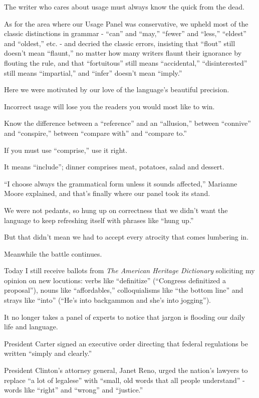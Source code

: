 \documentclass{book}
\numberwithin{equation}{section}
\begin{document}
The writer who cares about usage must always know the quick from the dead.

%
As for the area where our Usage Panel was conservative, we upheld most of the classic distinctions in grammar - ``can'' and ``may,'' ``fewer'' and ``less,'' ``eldest'' and ``oldest,'' etc. - and decried the classic errors, insisting that ``flout'' still doesn't mean ``flaunt,'' no matter how many writers flaunt their ignorance by flouting the rule, and that ``fortuitous'' still means ``accidental,'' ``disinterested'' still means ``impartial,'' and ``infer'' doesn't mean ``imply.''

Here we were motivated by our love of the language's beautiful precision.

Incorrect usage will lose you the readers you would most like to win.

Know the difference between a ``reference'' and an ``allusion,'' between ``connive'' and ``conspire,'' between ``compare with'' and ``compare to.''

If you must use ``comprise,'' use it right.

It means ``include''; dinner comprises meat, potatoes, salad and dessert.

%
``I choose always the grammatical form unless it sounds affected,'' Marianne Moore explained, and that's finally where our panel took its stand.

We were not pedants, so hung up on correctness that we didn't want the language to keep refreshing itself with phrases like ``hung up.''

But that didn't mean we had to accept every atrocity that comes lumbering in.

%
Meanwhile the battle continues.

Today I still receive ballots from \textit{The American Heritage Dictionary} soliciting my opinion on new locutions: verbs like ``definitize'' (``Congress definitized a proposal''), nouns like ``affordables,'' colloquialisms like ``the bottom line'' and strays like ``into'' (``He's into backgammon and she's into jogging'').

%
It no longer takes a panel of experts to notice that jargon is flooding our daily life and language.

President Carter signed an executive order directing that federal regulations be written ``simply and clearly.''

President Clinton's attorney general, Janet Reno, urged the nation's lawyers to replace ``a lot of legalese'' with ``small, old words that all people understand'' - words like ``right'' and ``wrong'' and ``justice.''
\end{document}
